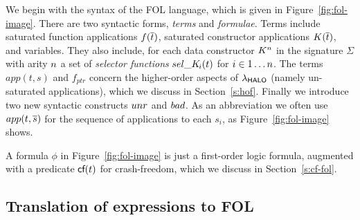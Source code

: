 We begin with the syntax of the FOL language, which is given in
Figure~\ref{fig:fol-image}. There are two syntactic forms,
\emph{terms} and \emph{formulae}. Terms include saturated function applications
$f(\overline{t})$, saturated constructor applications $K(\overline{t})$, and variables. They
also include, for each data constructor $K^n$ in the signature
$\Sigma$ with arity $n$ a set of {\em selector functions}
$\mathop{sel\_K\!_{i}}(t)$ for $i \in 1 \ldots n$.  The terms $app(t,s)$ and
$f_{ptr}$ concern the higher-order aspects of $\lambda_{\sf HALO}$
(namely un-saturated applications), which we
discuss in Section~\ref{s:hof}.  Finally we introduce two new
syntactic constructs $\mathop{unr}$ and $\mathop{bad}$. As an abbreviation we often use
$app(t,\overline{s})$ for the sequence of applications to each $s_i$, as
Figure~\ref{fig:fol-image} shows.

A formula $\phi$ in Figure~\ref{fig:fol-image} is just a first-order logic
formula, augmented with a predicate $\textsf{cf}(t)$ for crash-freedom, which
we discuss in Section~\ref{s:cf-fol}.

\subsection{Translation of expressions to FOL}

